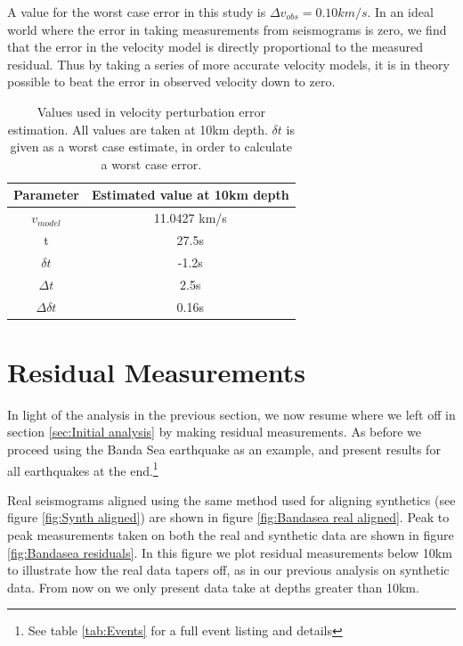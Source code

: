 \documentclass[11pt,a4paper]{article}
\begin{document}
A value for the worst case error in this study is $\Delta v_{obs} = 0.10 km/s$. In an ideal world where the error in taking measurements from seismograms is zero, we find that the error in the velocity model is directly proportional to the measured residual. Thus by taking a series of more accurate velocity models, it is in theory possible to beat the error in observed velocity down to zero.
\begin{table}
\centering
\begin{tabular}{| c | c |}
	\hline
	Parameter		& Estimated value at 10km depth	\\ \hline \hline
	$v_{model}$	& 11.0427 km/s					\\ \hline
	t			& 27.5s						\\ \hline
	$\delta t$		& -1.2s						\\ \hline
	$\Delta t$		& 2.5s						\\ \hline
	$\Delta \delta t$	& 0.16s						\\				
	\hline
\end{tabular}
\caption{Values used in velocity perturbation error estimation. All values are taken at 10km depth. $\delta t$ is given as a worst case estimate, in order to calculate a worst case error.}
\label{tab:Error values}
\end{table}

\section{Residual Measurements}

In light of the analysis in the previous section, we now resume where we left off in section \ref{sec:Initial analysis} by making residual measurements. As before we proceed using the Banda Sea earthquake as an example, and present results for all earthquakes at the end.\footnote{See table \ref{tab:Events} for a full event listing and details}

Real seismograms aligned using the same method used for aligning synthetics (see figure \ref{fig:Synth aligned}) are shown in figure \ref{fig:Bandasea real aligned}. Peak to peak measurements taken on both the real and synthetic data are shown in figure \ref{fig:Bandasea residuals}. In this figure we plot residual measurements below 10km to illustrate how the real data tapers off, as in our previous analysis on synthetic data. From now on we only present data take at depths greater than 10km.
\end{document}
